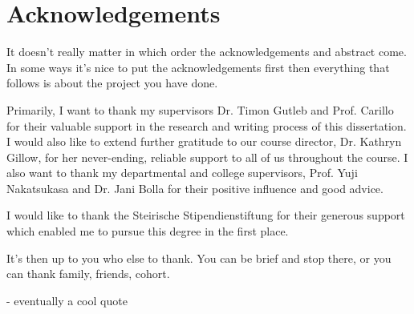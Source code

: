 \chapter*{Acknowledgements}
It doesn't really matter in which order the acknowledgements and abstract come.
In some ways it's nice to put the acknowledgements first then everything that follows is about the project you have done.

Primarily, I want to thank my supervisors Dr. Timon Gutleb and Prof. Carillo for their valuable support in the research and writing process of this dissertation.
I would also like to extend further gratitude to our course director, Dr. Kathryn Gillow, for her never-ending, reliable support to all of us throughout the course.
I also want to thank my departmental and college supervisors, Prof. Yuji Nakatsukasa and Dr. Jani Bolla for their positive influence and good advice.

I would like to thank the Steirische Stipendienstiftung for their generous support which enabled me to pursue this degree in the first place.

It's then up to you who else to thank. You can be brief and stop there, or you can thank family, friends, cohort.

- eventually a cool quote
